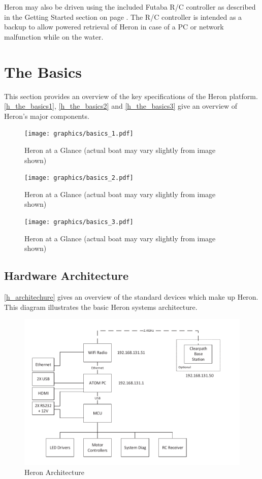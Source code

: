 \documentclass[]{clearpath-latex/clearpath-manual}
\begin{document}
Heron may also be driven using the included Futaba R/C controller as described in the Getting Started section on page \pageref{gettingstarted}. The R/C controller is intended as a backup to allow powered retrieval of Heron in case of a PC or network malfunction while on the water.

\section{The Basics}
This section provides an overview of the key specifications of the Heron platform. \autoref{h_the_basics1}, \autoref{h_the_basics2} and \autoref{h_the_basics3} give an overview of Heron's major components.

\begin{figure}[h]
  \centering  \texttt{[image: graphics/basics\_1.pdf]}
  \caption{Heron at a Glance (actual boat may vary slightly from image shown)}
  \label{h_the_basics1}
\end{figure}

\begin{figure}[h]
  \centering  \texttt{[image: graphics/basics\_2.pdf]}
  \caption{Heron at a Glance (actual boat may vary slightly from image shown)}
  \label{h_the_basics2}
\end{figure}

\begin{figure}[h]
  \centering  \texttt{[image: graphics/basics\_3.pdf]}
  \caption{Heron at a Glance (actual boat may vary slightly from image shown)}
  \label{h_the_basics3}
\end{figure}

\newpage

\subsection{Hardware Architecture}
\autoref{h_architechure} gives an overview of the standard devices which make up Heron. This diagram illustrates the basic Heron systems architecture.

\begin{figure}[h]
  \centering
  \includegraphics[width=0.85\linewidth]{graphics/h-architecture.pdf}
  \caption{Heron Architecture}
  \label{h_architechure}
\end{figure}
\end{document}
